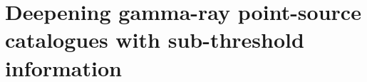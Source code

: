 
\section{Deepening gamma-ray point-source catalogues with sub-threshold information}
\label{sec:dnds_catalog_paper}









